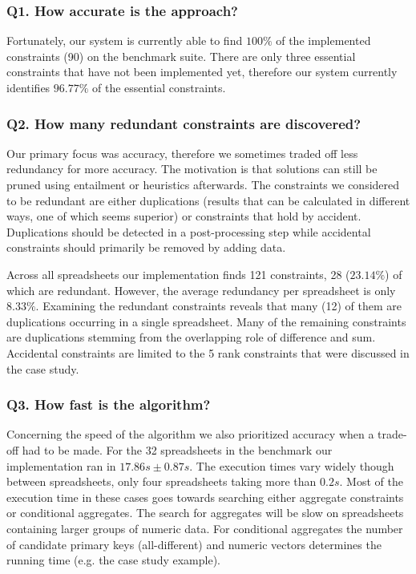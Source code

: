 \documentclass{ecai}
\begin{document}
\subsubsection*{Q1. How accurate is the approach?}
Fortunately, our system is currently able to find $100\%$ of the implemented constraints (90) on the benchmark suite.
There are only three essential constraints that have not been implemented yet, therefore our system currently identifies $96.77\%$ of the essential constraints.

\subsubsection*{Q2. How many redundant constraints are discovered?}
Our primary focus was accuracy, therefore we sometimes traded off less redundancy for more accuracy.
The motivation is that solutions can still be pruned using entailment or heuristics afterwards.
The constraints we considered to be redundant are either duplications (results that can be calculated in different ways, one of which seems superior) or constraints that hold by accident.
Duplications should be detected in a post-processing step while accidental constraints should primarily be removed by adding data.

Across all spreadsheets our implementation finds 121 constraints, 28 ($23.14\%$) of which are redundant.
However, the average redundancy per spreadsheet is only $8.33\%$.
Examining the redundant constraints reveals that many (12) of them are duplications occurring in a single spreadsheet.
Many of the remaining constraints are duplications stemming from the overlapping role of difference and sum.
Accidental constraints are limited to the 5 rank constraints that were discussed in the case study.

\subsubsection*{Q3. How fast is the algorithm?}
Concerning the speed of the algorithm we also prioritized accuracy when a trade-off had to be made.
For the 32 spreadsheets in the benchmark our implementation ran in $17.86s \pm 0.87s$.
The execution times vary widely though between spreadsheets, only four spreadsheets taking more than $0.2s$.
Most of the execution time in these cases goes towards searching either aggregate constraints or conditional aggregates.
The search for aggregates will be slow on spreadsheets containing larger groups of numeric data.
For conditional aggregates the number of candidate primary keys (all-different) and numeric vectors determines the running time (e.g. the case study example).
\end{document}
